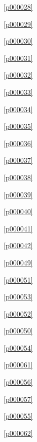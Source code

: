 \noindent\figurename\ \ref{p000028}\dotfill\pageref{p000028}

\noindent\figurename\ \ref{p000029}\dotfill\pageref{p000029}

\noindent\figurename\ \ref{p000030}\dotfill\pageref{p000030}

\noindent\figurename\ \ref{p000031}\dotfill\pageref{p000031}

\noindent\figurename\ \ref{p000032}\dotfill\pageref{p000032}

\noindent\figurename\ \ref{p000033}\dotfill\pageref{p000033}

\noindent\figurename\ \ref{p000034}\dotfill\pageref{p000034}

\noindent\figurename\ \ref{p000035}\dotfill\pageref{p000035}

\noindent\figurename\ \ref{p000036}\dotfill\pageref{p000036}

\noindent\figurename\ \ref{p000037}\dotfill\pageref{p000037}

\noindent\figurename\ \ref{p000038}\dotfill\pageref{p000038}

\noindent\figurename\ \ref{p000039}\dotfill\pageref{p000039}

\noindent\figurename\ \ref{p000040}\dotfill\pageref{p000040}

\noindent\figurename\ \ref{p000041}\dotfill\pageref{p000041}

\noindent\figurename\ \ref{p000042}\dotfill\pageref{p000042}

\noindent\figurename\ \ref{p000049}\dotfill\pageref{p000049}

\noindent\figurename\ \ref{p000051}\dotfill\pageref{p000051}

\noindent\figurename\ \ref{p000053}\dotfill\pageref{p000053}

\noindent\figurename\ \ref{p000052}\dotfill\pageref{p000052}

\noindent\figurename\ \ref{p000050}\dotfill\pageref{p000050}

\noindent\figurename\ \ref{p000054}\dotfill\pageref{p000054}

\noindent\figurename\ \ref{p000061}\dotfill\pageref{p000061}

\noindent\figurename\ \ref{p000056}\dotfill\pageref{p000056}

\noindent\figurename\ \ref{p000057}\dotfill\pageref{p000057}

\noindent\figurename\ \ref{p000055}\dotfill\pageref{p000055}

\noindent\figurename\ \ref{p000062}\dotfill\pageref{p000062}

